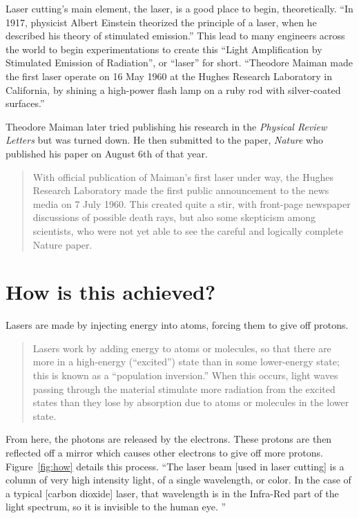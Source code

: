 \documentclass[12pt singlecol]{article}
\begin{document}
\begin{flushleft}
Laser cutting's main element, the laser, is a good place to begin, theoretically. ``In 1917, physicist Albert Einstein theorized the principle of a laser, when he described his theory of stimulated emission.'' \cite{Morgan13} This lead to many engineers across the world to begin experimentations to create this ``Light Amplification by Stimulated Emission of Radiation'', or ``laser'' for short. \cite{LTI13} ``Theodore Maiman made the first laser operate on 16 May 1960 at the Hughes Research Laboratory in California, by shining a high-power flash lamp on a ruby rod with silver-coated surfaces.'' \cite{Townes03} 

Theodore Maiman later tried publishing his research in the \emph{Physical Review Letters} but was turned down. He then submitted to the paper, \emph{Nature} who published his paper on August 6th of that year.
\begin{quotation}
With official publication of Maiman's first laser under way, the Hughes Research Laboratory made the first public announcement to the news media on 7 July 1960. This created quite a stir, with front-page newspaper discussions of possible death rays, but also some skepticism among scientists, who were not yet able to see the careful and logically complete Nature paper. \cite{Townes03} 
\end{quotation}

\section{How is this achieved?}

Lasers are made by injecting energy into atoms, forcing them to give off protons.
\begin{quotation}
Lasers work by adding energy to atoms or molecules, so that there are more in a high-energy (``excited'') state than in some lower-energy state; this is known as a ``population inversion.'' When this occurs, light waves passing through the material stimulate more radiation from the excited states than they lose by absorption due to atoms or molecules in the lower state. \cite{Townes03}
\end{quotation}
From here, the photons are released by the electrons. These protons are then reflected off a mirror which causes other electrons to give off more protons. Figure~\ref{fig:how} details this process. ``The laser beam [used in laser cutting] is a column of very high intensity light, of a single wavelength, or color. In the case of a typical [carbon dioxide] laser, that wavelength is in the Infra-Red part of the light spectrum, so it is invisible to the human eye. '' \cite{Zlotnicki13}


\end{flushleft}
\end{document}
